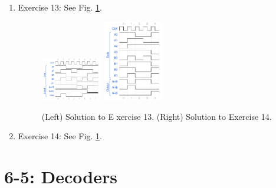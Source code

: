 \documentclass[10pt]{article}
\begin{document}
\begin{enumerate}
\item Exercise 13: See Fig. \ref{fig:wave2}.
\begin{figure}[hb]
\centering
\includegraphics[width=0.25\textwidth]{code/hmk5_6-2-8.pdf}
\includegraphics[width=0.25\textwidth]{code/hmk5_6-4-14.pdf}
\caption{\label{fig:wave2} (Left) Solution to E xercise 13.  (Right) Solution to Exercise 14.}
\end{figure}
\item Exercise 14: See Fig. \ref{fig:wave2}.
\end{enumerate}

\section{6-5: Decoders}
\end{document}
